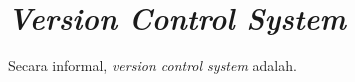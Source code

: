 \section{\textit{Version Control System}}
Secara informal, \textit{version control system} adalah.



